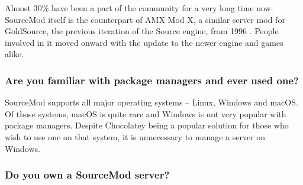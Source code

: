 \begin{figure}[H]
  \centering
\end{figure}

Almost 30\% have been a part of the community for a very long time now.
SourceMod itself is the counterpart of AMX Mod X, a similar server mod for GoldSource, the previous iteration of the Source engine, from 1996 \cite{valve-goldsrc}.
People involved in it moved onward with the update to the newer engine and games alike.

\subsubsection{Are you familiar with package managers and ever used one?}

\begin{figure}[H]
  \centering
\end{figure}

SourceMod supports all major operating systems -- Linux, Windows and macOS\@.
Of those systems, macOS is quite rare and Windows is not very popular with package managers.
Despite Chocolatey \cite{chocolatey} being a popular solution for those who wish to use one on that system, it is unnecessary to manage a server on Windows.

\subsubsection{Do you own a SourceMod server?}

